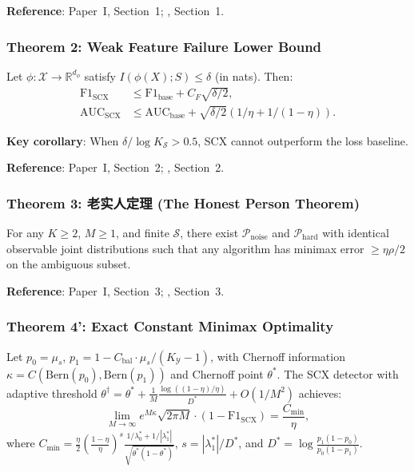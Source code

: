 \documentclass{article}
\begin{document}
\textbf{Reference}: Paper~I, Section~1; \cite{theorems_unified}, Section~1.

\subsubsection*{Theorem 2: Weak Feature Failure Lower Bound}
Let $\phi: \mathcal{X} \to \mathbb{R}^{d_\phi}$ satisfy $I(\phi(X); S) \leq \delta$ (in nats). Then:
\begin{align}
\text{F1}_{\text{SCX}} &\leq \text{F1}_{\text{base}} + C_F\sqrt{\delta/2}, \\
\text{AUC}_{\text{SCX}} &\leq \text{AUC}_{\text{base}} + \sqrt{\delta/2}(1/\eta + 1/(1-\eta)).
\end{align}

\textbf{Key corollary}: When $\delta / \log K_{\mathcal{S}} > 0.5$, SCX cannot outperform the loss baseline.

\textbf{Reference}: Paper~I, Section~2; \cite{theorems_unified}, Section~2.

\subsubsection*{Theorem 3: 老实人定理 (The Honest Person Theorem)}
For any $K \geq 2$, $M \geq 1$, and finite $\mathcal{S}$, there exist $\mathcal{P}_{\text{noise}}$ and $\mathcal{P}_{\text{hard}}$ with identical observable joint distributions such that any algorithm has minimax error $\geq \eta\rho/2$ on the ambiguous subset.

\textbf{Reference}: Paper~I, Section~3; \cite{theorems_unified}, Section~3.

\subsubsection*{Theorem 4': Exact Constant Minimax Optimality}
Let $p_0 = \mu_s$, $p_1 = 1 - C_{\text{bal}}\cdot\mu_s/(K_{\mathcal{Y}}-1)$, with Chernoff information $\kappa = C(\text{Bern}(p_0), \text{Bern}(p_1))$ and Chernoff point $\theta^*$. The SCX detector with adaptive threshold $\theta^\dagger = \theta^* + \frac{1}{M}\frac{\log((1-\eta)/\eta)}{D^*} + O(1/M^2)$ achieves:
\begin{equation}
\lim_{M\to\infty} e^{M\kappa}\sqrt{2\pi M}\cdot(1-\text{F1}_{\text{SCX}}) = \frac{C_{\min}}{\eta},
\end{equation}
where $C_{\min} = \frac{\eta}{2}(\frac{1-\eta}{\eta})^s \frac{1/\lambda_0^* + 1/|\lambda_1^*|}{\sqrt{\theta^*(1-\theta^*)}}$, $s = |\lambda_1^*|/D^*$, and $D^* = \log\frac{p_1(1-p_0)}{p_0(1-p_1)}$.
\end{document}
